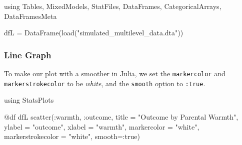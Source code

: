 \documentclass[
  letterpaper,
  DIV=11,
  numbers=noendperiod]{scrreprt}
\newenvironment{Shaded}{\begin{snugshade}}{\end{snugshade}}
\newcommand{\BuiltInTok}[1]{\textcolor[rgb]{0.00,0.23,0.31}{#1}}
\newcommand{\ConstantTok}[1]{\textcolor[rgb]{0.56,0.35,0.01}{#1}}
\newcommand{\FunctionTok}[1]{\textcolor[rgb]{0.28,0.35,0.67}{#1}}
\newcommand{\ImportTok}[1]{\textcolor[rgb]{0.00,0.46,0.62}{#1}}
\newcommand{\NormalTok}[1]{\textcolor[rgb]{0.00,0.23,0.31}{#1}}
\newcommand{\OperatorTok}[1]{\textcolor[rgb]{0.37,0.37,0.37}{#1}}
\newcommand{\PreprocessorTok}[1]{\textcolor[rgb]{0.68,0.00,0.00}{#1}}
\newcommand{\StringTok}[1]{\textcolor[rgb]{0.13,0.47,0.30}{#1}}
\begin{document}
\begin{Shaded}
\begin{Highlighting}[]
\ImportTok{using} \BuiltInTok{Tables}\NormalTok{, }\BuiltInTok{MixedModels}\NormalTok{, }\BuiltInTok{StatFiles}\NormalTok{, }\BuiltInTok{DataFrames}\NormalTok{, }\BuiltInTok{CategoricalArrays}\NormalTok{, }\BuiltInTok{DataFramesMeta}

\NormalTok{dfL }\OperatorTok{=} \FunctionTok{DataFrame}\NormalTok{(}\FunctionTok{load}\NormalTok{(}\StringTok{"simulated\_multilevel\_data.dta"}\NormalTok{))}
\end{Highlighting}
\end{Shaded}

\subsubsection{Line Graph}\label{line-graph-2}

To make our plot with a smoother in Julia, we set the
\texttt{markercolor} and \texttt{markerstrokecolor} to be \emph{white},
and the \texttt{smooth} option to \texttt{:true}.

\begin{Shaded}
\begin{Highlighting}[]
\ImportTok{using} \BuiltInTok{StatsPlots}

\PreprocessorTok{@df}\NormalTok{ dfL }\FunctionTok{scatter}\NormalTok{(}\OperatorTok{:}\NormalTok{warmth, }\OperatorTok{:}\NormalTok{outcome, }
\NormalTok{               title }\OperatorTok{=} \StringTok{"Outcome by Parental Warmth"}\NormalTok{,}
\NormalTok{               ylabel }\OperatorTok{=} \StringTok{"outcome"}\NormalTok{,}
\NormalTok{               xlabel }\OperatorTok{=} \StringTok{"warmth"}\NormalTok{,}
\NormalTok{               markercolor }\OperatorTok{=} \StringTok{"white"}\NormalTok{,}
\NormalTok{               markerstrokecolor }\OperatorTok{=} \StringTok{"white"}\NormalTok{,}
\NormalTok{               smooth}\OperatorTok{=:}\ConstantTok{true}\NormalTok{)}
\end{Highlighting}
\end{Shaded}
\end{document}
